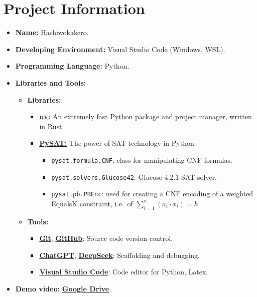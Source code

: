 \section{Project Information}
\begin{itemize}
  \item \textbf{Name:} Hashiwokakero.
  \item \textbf{Developing Environment:} Visual Studio Code (Windows, WSL).
  \item \textbf{Programming Language:} Python.
  \item \textbf{Libraries and Tools:}
        \begin{itemize}
          \item \textbf{Libraries:}
                \begin{itemize}
                  \item \href{https://docs.astral.sh/uv/getting-started/installation/}{\textbf{uv:}} An extremely fast Python package and project manager, written in Rust.
                  \item \href{https://pysathq.github.io/}{\textbf{PySAT:}} The power of SAT technology in Python
                        \begin{itemize}
                          \item \verb|pysat.formula.CNF|: class for manipulating CNF formulas.
                          \item \verb|pysat.solvers.Glucose42|: Glucose 4.2.1 SAT solver.
                          \item \verb|pysat.pb.PBEnc|: used for creating a CNF encoding of a weighted EqualsK constraint, i.e.\ of \(\sum_{i = 1}^{n}(a_i \cdot x_i) = k\)
                        \end{itemize}
                \end{itemize}
          \item \textbf{Tools:}
                \begin{itemize}
                  \item \href{https://git-scm.com/}{\textbf{Git}}, \href{https://github.com/}{\textbf{GitHub}}: Source code version control.
                  \item \href{https://chatgpt.com/}{\textbf{ChatGPT}}, \href{https://chat.deepseek.com/}{\textbf{DeepSeek}}: Scaffolding and debugging.
                  \item \href{https://code.visualstudio.com/}{\textbf{Visual Studio Code}}: Code editor for Python, Latex.
                \end{itemize}
        \end{itemize}
  \item \textbf{Demo video:} \href{https://google.com}{\textbf{Google Drive}}.
\end{itemize}
